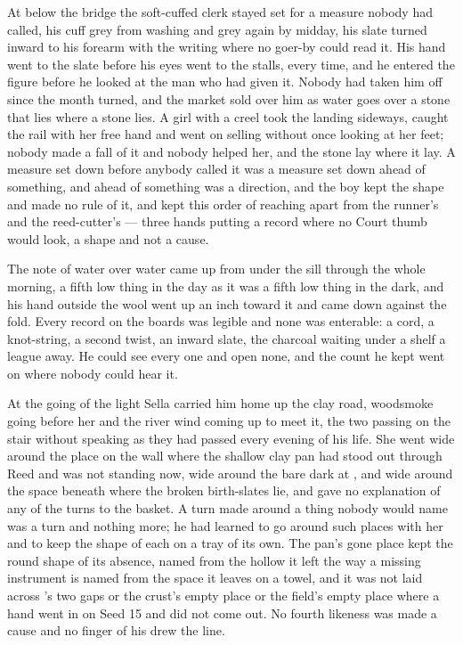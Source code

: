 At  below the bridge the soft-cuffed clerk stayed set for a measure nobody had called, his cuff grey from washing and grey again by midday, his slate turned inward to his forearm with the writing where no goer-by could read it. His hand went to the slate before his eyes went to the stalls, every time, and he entered the figure before he looked at the man who had given it. Nobody had taken him off since the month turned, and the market sold over him as water goes over a stone that lies where a stone lies. A girl with a creel took the landing sideways, caught the rail with her free hand and went on selling without once looking at her feet; nobody made a fall of it and nobody helped her, and the stone lay where it lay. A measure set down before anybody called it was a measure set down ahead of something, and ahead of something was a direction, and the boy kept the shape and made no rule of it, and kept this order of reaching apart from the runner's and the reed-cutter's — three hands putting a record where no Court thumb would look, a shape and not a cause.

The note of water over water came up from under the sill through the whole morning, a fifth low thing in the day as it was a fifth low thing in the dark, and his hand outside the wool went up an inch toward it and came down against the fold. Every record on the boards was legible and none was enterable: a cord, a knot-string, a second twist, an inward slate, the charcoal waiting under a shelf a league away. He could see every one and open none, and the count he kept went on where nobody could hear it.

\scenebreak

At the going of the light Sella carried him home up the clay road, woodsmoke going before her and the river wind coming up to meet it, the two passing on the stair without speaking as they had passed every evening of his life. She went wide around the place on the wall where the shallow clay pan had stood out through Reed and was not standing now, wide around the bare dark  at , and wide around the space beneath  where the broken birth-slates lie, and gave no explanation of any of the turns to the basket. A turn made around a thing nobody would name was a turn and nothing more; he had learned to go around such places with her and to keep the shape of each on a tray of its own. The pan's gone place kept the round shape of its absence, named from the hollow it left the way a missing instrument is named from the space it leaves on a towel, and it was not laid across 's two gaps or the crust's empty place or the field's empty place where a hand went in on Seed 15 and did not come out. No fourth likeness was made a cause and no finger of his drew the line.

